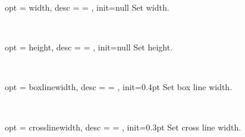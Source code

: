 \documentclass[full]{l3doc}
\begin{document}
\begin{documentation}
\bigskip

\begin{option}{ opt = width, desc = {= }, init=null }
  Set width.
\end{option}\\
\begin{SideBySideExample}[frame=single,numbers=left,xrightmargin=.45\linewidth,gobble=2]
  \centering
  \quad
  \quad
\end{SideBySideExample}

\bigskip

\begin{option}{ opt = height, desc = {= }, init=null }
  Set height.
\end{option}\\
\begin{SideBySideExample}[frame=single,numbers=left,xrightmargin=.45\linewidth,gobble=2]
  \centering
  \quad
  \quad
\end{SideBySideExample}

\bigskip

\begin{option}{ opt = boxlinewidth, desc = {= }, init=0.4pt }
  Set box line width.
\end{option}\\
\begin{SideBySideExample}[frame=single,numbers=left,xrightmargin=.44\linewidth,gobble=2]
  \centering
  \quad
  \quad
\end{SideBySideExample}

\bigskip

\begin{option}{ opt = crosslinewidth, desc = {= }, init=0.3pt }
  Set cross line width.
\end{option}\\
\begin{SideBySideExample}[frame=single,numbers=left,xrightmargin=.44\linewidth,gobble=2]
  \centering
  \quad
  \quad
\end{SideBySideExample}


\end{documentation}
\end{document}
